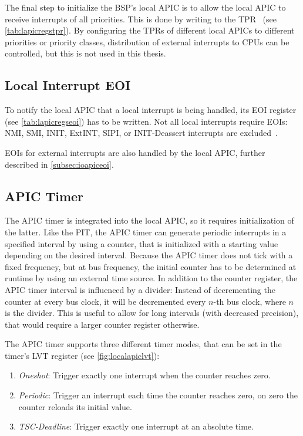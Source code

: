 The final step to initialize the BSP's local APIC is to allow the local APIC to receive interrupts of all priorities.
This is done by writing  to the TPR~\autocite[sec.~3.11.8.3]{ia32} (see \autoref{tab:lapicregstpr}).
By configuring the TPRs of different local APICs to different priorities or priority classes, distribution of external interrupts to CPUs can be controlled, but this is not used in this thesis.

\subsection{Local Interrupt EOI}
\label{subsec:lapiceoi}

To notify the local APIC that a local interrupt is being handled, its EOI register (see \autoref{tab:lapicregseoi}) has to be written.
Not all local interrupts require EOIs: NMI, SMI, INIT, ExtINT, SIPI, or INIT-Deassert interrupts are excluded~\autocite[sec.~3.11.8.5]{ia32}.

EOIs for external interrupts are also handled by the local APIC, further described in \autoref{subsec:ioapiceoi}.

\subsection{APIC Timer}
\label{subsec:lapictimer}

The APIC timer is integrated into the local APIC, so it requires initialization of the latter.
Like the PIT, the APIC timer can generate periodic interrupts in a specified interval by using a counter, that is initialized with a starting value depending on the desired interval.
Because the APIC timer does not tick with a fixed frequency, but at bus frequency, the initial counter has to be determined at runtime by using an external time source.
In addition to the counter register, the APIC timer interval is influenced by a divider: Instead of decrementing the counter at every bus clock, it will be decremented every \(n\)-th bus clock, where \(n\) is the divider.
This is useful to allow for long intervals (with decreased precision), that would require a larger counter register otherwise.

The APIC timer supports three different timer modes, that can be set in the timer's LVT register (see \autoref{fig:localapiclvt}):

\begin{enumerate}
  \item \textit{Oneshot}: Trigger exactly one interrupt when the counter reaches zero.
  \item \textit{Periodic}: Trigger an interrupt each time the counter reaches zero, on zero the counter reloads its initial value.
  \item \textit{TSC-Deadline}: Trigger exactly one interrupt at an absolute time.
\end{enumerate}

